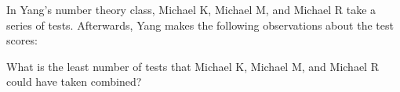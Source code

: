 In Yang's number theory class, Michael K, Michael M, and Michael R take a series of tests. Afterwards, Yang makes the following observations about the test scores:

\begin{itemize}
\end{itemize}

What is the least number of tests that Michael K, Michael M, and Michael R could have taken combined?
